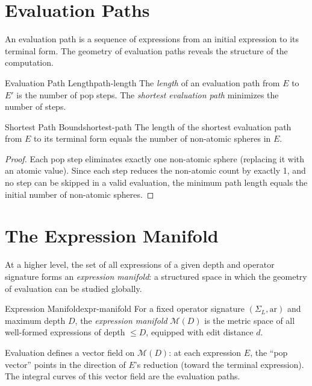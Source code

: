 \section{Evaluation Paths}

An evaluation path is a sequence of expressions from an initial
expression to its terminal form. The geometry of evaluation paths
reveals the structure of the computation.

\begin{definition}{Evaluation Path Length}{path-length}
  The \emph{length} of an evaluation path from $E$ to $E'$ is the
  number of pop steps. The \emph{shortest evaluation path} minimizes
  the number of steps.
\end{definition}

\begin{proposition}{Shortest Path Bound}{shortest-path}
  The length of the shortest evaluation path from $E$ to its terminal
  form equals the number of non-atomic spheres in $E$.
\end{proposition}

\begin{proof}
  Each pop step eliminates exactly one non-atomic sphere (replacing it
  with an atomic value). Since each step reduces the non-atomic count
  by exactly 1, and no step can be skipped in a valid evaluation, the
  minimum path length equals the initial number of non-atomic spheres.
\end{proof}

\section{The Expression Manifold}

At a higher level, the set of all expressions of a given depth and
operator signature forms an \emph{expression manifold}: a structured
space in which the geometry of evaluation can be studied globally.

\begin{definition}{Expression Manifold}{expr-manifold}
  For a fixed operator signature $(\Sigma_L, \mathrm{ar})$ and
  maximum depth $D$, the \emph{expression manifold} $\mathcal{M}(D)$
  is the metric space of all well-formed expressions of depth $\leq D$,
  equipped with edit distance $d$.
\end{definition}

Evaluation defines a vector field on $\mathcal{M}(D)$: at each
expression $E$, the ``pop vector'' points in the direction of $E$'s
reduction (toward the terminal expression). The integral curves of
this vector field are the evaluation paths.

